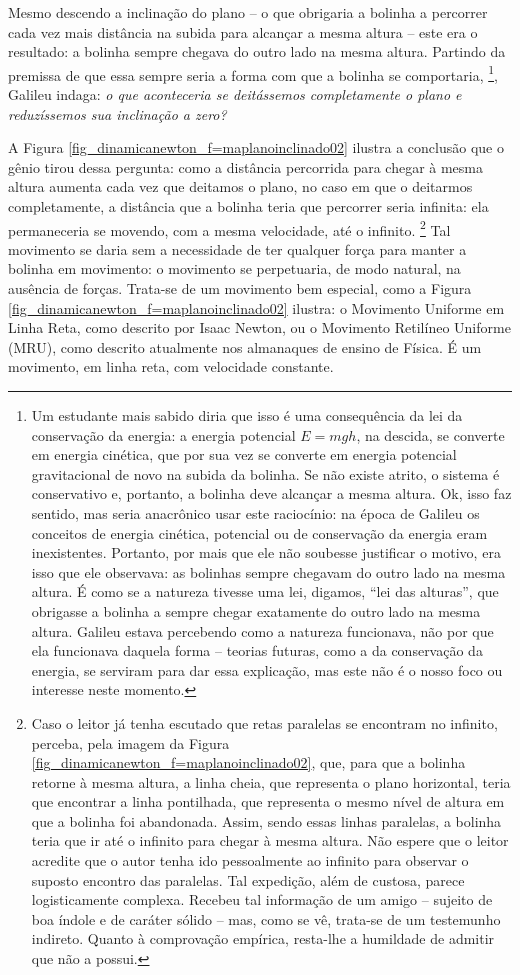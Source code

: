 Mesmo descendo a inclinação do plano -- o que obrigaria a bolinha a percorrer cada vez mais distância na subida para alcançar a mesma altura -- este era o resultado: a bolinha sempre chegava do outro lado na mesma altura. Partindo da premissa de que essa sempre seria a forma com que a bolinha se comportaria, \footnote{Um estudante mais sabido diria que isso é uma consequência da lei da conservação da energia: a energia potencial $E=mgh$, na descida, se converte em energia cinética, que por sua vez se converte em energia potencial gravitacional de novo na subida da bolinha. Se não existe atrito, o sistema é conservativo e, portanto, a bolinha deve alcançar a mesma altura. Ok, isso faz sentido, mas seria anacrônico usar este raciocínio: na época de Galileu os conceitos de energia cinética, potencial ou de conservação da energia eram inexistentes. Portanto, por mais que ele não soubesse justificar o motivo, era isso que ele observava: as bolinhas sempre chegavam do outro lado na mesma altura. É como se a natureza tivesse uma lei, digamos, ``lei das alturas'', que obrigasse a bolinha a sempre chegar exatamente do outro lado na mesma altura. Galileu estava percebendo como a natureza funcionava, não por que ela funcionava daquela forma -- teorias futuras, como a da conservação da energia, se serviram para dar essa explicação, mas este não é o nosso foco ou interesse neste momento.}, Galileu indaga: \textit{o que aconteceria se deitássemos completamente o plano e reduzíssemos sua inclinação a zero?}

A Figura \ref{fig_dinamicanewton_f=maplanoinclinado02} ilustra a conclusão que o gênio tirou dessa pergunta: como a distância percorrida para chegar à mesma altura aumenta cada vez que deitamos o plano, no caso em que o deitarmos completamente, a distância que a bolinha teria que percorrer seria infinita: ela permaneceria se movendo, com a mesma velocidade, até o infinito. \footnote{Caso o leitor já tenha escutado que retas paralelas se encontram no infinito, perceba, pela imagem da Figura \ref{fig_dinamicanewton_f=maplanoinclinado02}, que, para que a bolinha retorne à mesma altura, a linha cheia, que representa o plano horizontal, teria que encontrar a linha pontilhada, que representa o mesmo nível de altura em que a bolinha foi abandonada. Assim, sendo essas linhas paralelas, a bolinha teria que ir até o infinito para chegar à mesma altura. Não espere que o leitor acredite que o autor tenha ido pessoalmente ao infinito para observar o suposto encontro das paralelas. Tal expedição, além de custosa, parece logisticamente complexa. Recebeu tal informação de um amigo -- sujeito de boa índole e de caráter sólido -- mas, como se vê, trata-se de um testemunho indireto. Quanto à comprovação empírica, resta-lhe a humildade de admitir que não a possui.} Tal movimento se daria sem a necessidade de ter qualquer força para manter a bolinha em movimento: o movimento se perpetuaria, de modo natural, na ausência de forças. Trata-se de um movimento bem especial, como a Figura \ref{fig_dinamicanewton_f=maplanoinclinado02} ilustra: o Movimento Uniforme em Linha Reta, como descrito por Isaac Newton, ou o Movimento Retilíneo Uniforme (MRU), como descrito atualmente nos almanaques de ensino de Física. É um movimento, em linha reta, com velocidade constante. 

